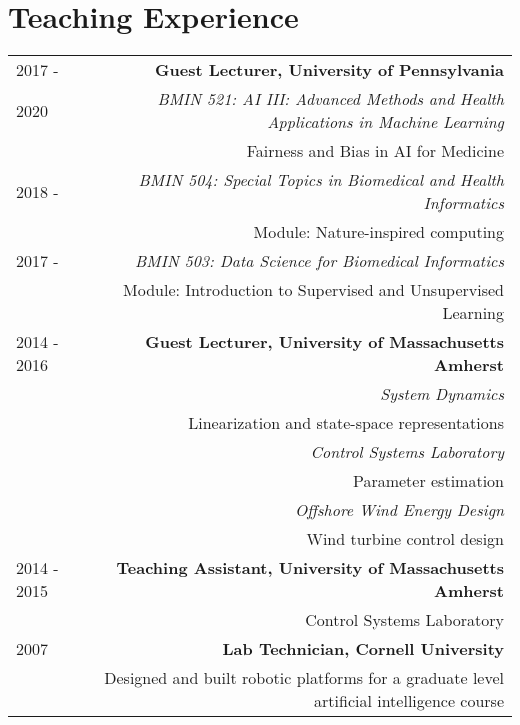 \section*{Teaching Experience}
\begin{tabular}{L!{\VRule}R}
2017 -  & {\bf Guest Lecturer, University of Pennsylvania}\\
2020    & \textit{BMIN 521: AI III: Advanced Methods and Health Applications in Machine Learning}  \\
        & \hspace{1em} Fairness and Bias in AI for Medicine \\
2018 -  & \textit{BMIN 504: Special Topics in Biomedical and Health Informatics} \\
        & \hspace{1em} Module: Nature-inspired computing \\
2017 -  & \textit{BMIN 503: Data Science for Biomedical Informatics} \\
        & \hspace{1em} Module: Introduction to Supervised and Unsupervised Learning \\
2014 - 2016 & {\bf Guest Lecturer, University of Massachusetts Amherst}\\
            & \textit{System Dynamics}\\
            & \hspace{1em} Linearization and state-space representations\\
            & \textit{Control Systems Laboratory}\\
            & \hspace{1em} Parameter estimation\\
            & \textit{Offshore Wind Energy Design}\\
            & \hspace{1em} Wind turbine control design \\
2014 - 2015& {\bf Teaching Assistant, University of Massachusetts Amherst} \\
& Control Systems Laboratory \\
2007& {\bf Lab Technician, Cornell University}\\
& Designed and built robotic platforms for a graduate level artificial intelligence course\\
\end{tabular}
